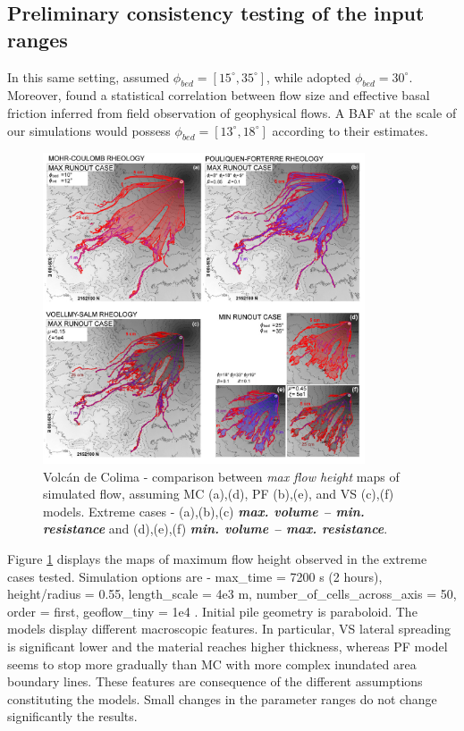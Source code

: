 \documentclass{article}
\begin{document}
\subsection{Preliminary consistency testing of the input ranges}
In this same setting, \cite{Dalbey2008} assumed $\phi_{bed}=[15^\mathrm{\circ}, 35^\mathrm{\circ}]$, while \citep{Capra2011} adopted $\phi_{bed}=30^\mathrm{\circ}$. Moreover, \cite{Spiller2014,Bayarri2015,Ogburn2016} found a statistical correlation between flow size and effective basal friction inferred from field observation of geophysical flows. A BAF at the scale of our simulations would possess $\phi_{bed}=[13^\mathrm{\circ}, 18^\mathrm{\circ}]$ according to their estimates.
\begin{figure}[H]
         \centering
        \includegraphics[width=0.85\textwidth]{Figures/ExtremeMaps.jpg}
        \caption{Volc\'an de Colima - comparison between \emph{max flow height} maps of simulated flow, assuming MC (a),(d), PF (b),(e), and VS (c),(f) models. Extreme cases - (a),(b),(c) \emph{\textbf{max. volume -- min. resistance}} and (d),(e),(f) \emph{\textbf{min. volume -- max. resistance}}.}
        \label{Colima-MaxMinExtents}
\end{figure}
Figure \ref{Colima-MaxMinExtents} displays the maps of maximum flow height observed in the extreme cases tested. Simulation options are - max\_time = 7200 s (2 hours), height/radius = 0.55, length\_scale = 4e3 m, number\_of\_cells\_across\_axis = 50, order = first, geoflow\_tiny = 1e4 \citep{Patra2005,Aghakhani2016}. Initial pile geometry is paraboloid. The models display different macroscopic features. In particular, VS lateral spreading is significant lower and the material reaches higher thickness, whereas PF model seems to stop more gradually than MC with more complex inundated area boundary lines. These features are consequence of the different assumptions constituting the models. Small changes in the parameter ranges do not change significantly the results.
\end{document}
